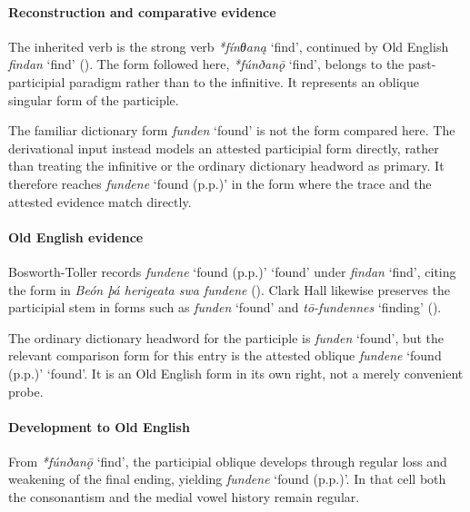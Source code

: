 \documentclass[
  british,
  a4paper,
]{article}
\providecommand{\Recon}[1]{\emph{*#1}}
\begin{document}
\paragraph{Reconstruction and comparative
evidence}\label{reconstruction-and-comparative-evidence-121}

The inherited verb is the strong verb \Recon{fínθaną} `find', continued
by Old English {\emph{findan}} `find'
(). The form
followed here, \Recon{fúnðanǭ} `find', belongs to the past-participial
paradigm rather than to the infinitive. It represents an oblique
singular form of the participle.

The familiar dictionary form {\emph{funden}} `found' is not the form
compared here. The derivational input instead models an attested
participial form directly, rather than treating the infinitive or the
ordinary dictionary headword as primary. It therefore reaches
{\emph{fundene}} `found (p.p.)' in the form where the trace and the
attested evidence match directly.

\paragraph{Old English evidence}\label{old-english-evidence-121}

Bosworth-Toller records {\emph{fundene}} `found (p.p.)' `found' under
{\emph{findan}} `find', citing the form in \emph{Beón þá herigeata swa
fundene} (). Clark Hall likewise preserves the participial stem in forms such
as {\emph{funden}} `found' and \emph{tō-fundennes} `finding'
().

The ordinary dictionary headword for the participle is {\emph{funden}}
`found', but the relevant comparison form for this entry is the attested
oblique {\emph{fundene}} `found (p.p.)' `found'. It is an Old English
form in its own right, not a merely convenient probe.

\paragraph{Development to Old
English}\label{development-to-old-english-121}

From \Recon{fúnðanǭ} `find', the participial oblique develops through
regular loss and weakening of the final ending, yielding
{\emph{fundene}} `found (p.p.)'. In that cell both the consonantism and
the medial vowel history remain regular.
\end{document}
